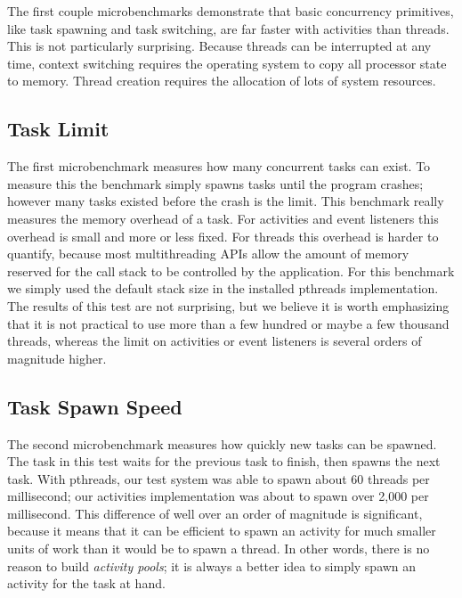 \documentclass[10pt,preprint]{sigplanconf}
\begin{document}
The first couple microbenchmarks demonstrate that basic concurrency primitives, like task spawning and task switching, are far faster with activities than threads.
This is not particularly surprising.
Because threads can be interrupted at any time, context switching requires the operating system to copy all processor state to memory.
Thread creation requires the allocation of lots of system resources.

\subsection{Task Limit}

The first microbenchmark measures how many concurrent tasks can exist.
To measure this the benchmark simply spawns tasks until the program crashes; however many tasks existed before the crash is the limit.
This benchmark really measures the memory overhead of a task.
For activities and event listeners this overhead is small and more or less fixed.
For threads this overhead is harder to quantify, because most multithreading APIs allow the amount of memory reserved for the call stack to be controlled by the application.
For this benchmark we simply used the default stack size in the installed pthreads implementation.
The results of this test are not surprising, but we believe it is worth emphasizing that it is not practical to use more than a few hundred or maybe a few thousand threads, whereas the limit on activities or event listeners is several orders of magnitude higher.

\subsection{Task Spawn Speed}


The second microbenchmark measures how quickly new tasks can be spawned.
The task in this test waits for the previous task to finish, then spawns the next task.
With pthreads, our test system was able to spawn about 60 threads per millisecond; our activities implementation was about to spawn over 2,000 per millisecond.
This difference of well over an order of magnitude is significant, because it means that it can be efficient to spawn an activity for much smaller units of work than it would be to spawn a thread.
In other words, there is no reason to build \emph{activity pools}; it is always a better idea to simply spawn an activity for the task at hand.
\end{document}
